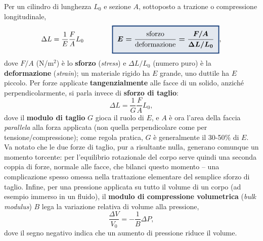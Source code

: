 \documentclass[a4paper,11pt]{article}
\newcommand{\keyeq}[1]{{\setlength{\fboxsep}{6pt}\setlength{\fboxrule}{1.3pt}\fcolorbox{chapblue}{chapblue!12}{\boldmath$\displaystyle #1$}}}
\begin{document}
Per un cilindro di lunghezza $L_0$ e sezione $A$, sottoposto a trazione o compressione longitudinale,
\[
\Delta L = \frac{1}{E}\frac{F}{A}L_0 \qquad\qquad \keyeq{E = \frac{\text{sforzo}}{\text{deformazione}} = \frac{F/A}{\Delta L/L_0}},
\]
dove $F/A$ (N/m$^2$) è lo \textbf{sforzo} (\emph{stress}) e $\Delta L/L_0$ (numero puro) è la \textbf{deformazione} (\emph{strain}); un materiale rigido ha $E$ grande, uno duttile ha $E$ piccolo. Per forze applicate \textbf{tangenzialmente} alle facce di un solido, anziché perpendicolarmente, si parla invece di \textbf{sforzo di taglio}:
\[
\Delta L = \frac{1}{G}\frac{F}{A}L_0,
\]
dove il \textbf{modulo di taglio} $G$ gioca il ruolo di $E$, e $A$ è ora l'area della faccia \emph{parallela} alla forza applicata (non quella perpendicolare come per tensione/compressione); come regola pratica, $G$ è generalmente il 30-50\% di $E$. Va notato che le due forze di taglio, pur a risultante nulla, generano comunque un momento torcente: per l'equilibrio rotazionale del corpo serve quindi una seconda coppia di forze, normale alle facce, che bilanci questo momento -- una complicazione spesso omessa nella trattazione elementare del semplice sforzo di taglio. Infine, per una pressione applicata su tutto il volume di un corpo (ad esempio immerso in un fluido), il \textbf{modulo di compressione volumetrica} (\emph{bulk modulus}) $B$ lega la variazione relativa di volume alla pressione,
\[
\frac{\Delta V}{V_0} = -\frac{1}{B}\Delta P,
\]
dove il segno negativo indica che un aumento di pressione riduce il volume.
\end{document}
